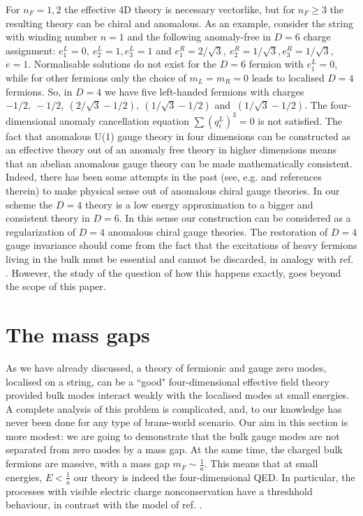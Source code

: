 \documentclass[a4paper,12pt]{article}
\begin{document}
For $n_F=1,2$ the effective 4D theory is necessary vectorlike, but
for $n_F\geq 3$ the resulting theory can be chiral and anomalous. As
an example, consider the string with winding number $n=1$ and the
following  anomaly-free in $D=6$ charge assignment:
$e_1^L=0,~e_2^L=1, e_3^L=1$ and  $e_1^R=2/\sqrt{3},~e_2^R=1/\sqrt{3},
e_3^R=1/\sqrt{3}$, $e=1$. Normalisable solutions do not exist for the
$D=6$ fermion with $e_1^L=0$, while for other fermions only the
choice of  $m_L=m_R=0$ leads to localised $D=4$ fermions. So, in
$D=4$ we have five left-handed fermions with charges
$-1/2,~-1/2,~(2/\sqrt{3}-1/2),~(1/\sqrt{3}-1/2)$ and
$~(1/\sqrt{3}-1/2)$. The four-dimensional anomaly cancellation
equation $\sum (q_i^L)^3=0$ is not satisfied. The fact that anomalous
U(1) gauge theory in four dimensions can be constructed as an
effective theory out of an anomaly free theory in higher dimensions
means that an abelian anomalous gauge theory can be made
mathematically consistent. Indeed, there has been some attempts in
the past (see, e.g. \cite{Faddeev:pc} and references therein) to make
physical sense out of anomalous chiral gauge theories.  In our scheme
the $D=4$ theory is a low energy approximation to a bigger and
consistent theory in $D=6$. In this sense our construction can be
considered as a regularization of $D=4$ anomalous chiral gauge
theories. The restoration of $D=4$ gauge invariance should come from
the fact that the  excitations of heavy fermions living in the bulk
must be essential and cannot be discarded, in analogy with ref.
\cite{D'Hoker:1984pc}. However, the study of the question of how this
happens exactly, goes beyond the scope of this paper. 

\section{The mass gaps} 

As we have already discussed, a theory of fermionic and gauge zero
modes, localised on a string, can be a ``good" four-dimensional
effective field theory provided bulk modes interact weakly with the
localised modes at small energies. A complete analysis of this
problem is complicated, and, to our  knowledge has never been
done for any type of brane-world scenario. Our aim in this section is
more modest: we are going to demonstrate that the bulk gauge modes
are not separated from zero modes by a mass gap. At the same time,
the charged bulk fermions are massive, with a mass gap $m_F\sim
\frac{1}{a}$. This means that at small energies, $E < \frac{1}{a}$
our theory is indeed the four-dimensional QED. In particular, the
processes with visible electric charge nonconservation have a
threshhold behaviour, in  contrast with the model of ref.
\cite{Dubovsky:2000av}.
\end{document}
